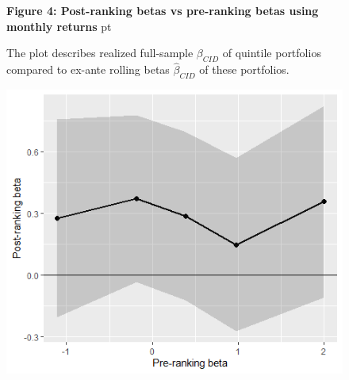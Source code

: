 \documentclass[12pt]{article}
\begin{document}
\begin{figure}
\textbf{Figure 4: Post-ranking betas vs pre-ranking betas using monthly returns}
 pt
\begin{flushleft}
{The plot describes realized full-sample $\beta_{CID}$ of quintile portfolios compared to ex-ante rolling betas $\hat{\beta}_{CID}$ of these portfolios.}
\end{flushleft}
\centering
\includegraphics[width=1\textwidth]{betas_nov_0.png}
\end{figure}
\end{document}
